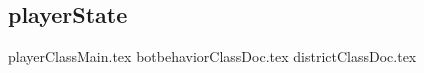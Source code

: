 \subsection{playerState}
\label{ss:playerState}

{playerClassMain.tex}
{botbehaviorClassDoc.tex}
\newpage
{districtClassDoc.tex}